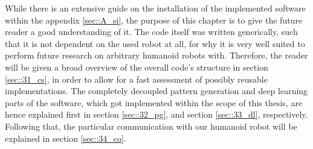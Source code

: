 While there is an extensive guide on the installation of the implemented software within the appendix \ref{sec::A_si}, the purpose of this chapter is to give the future reader a good understanding of it. The code itself was written generically, such that it is not dependent on the used robot at all, for why it is very well suited to perform future research on arbitrary humanoid robots with. Therefore, the reader will be given a broad overview of the overall code's structure in section \ref{sec::31_cs}, in order to allow for a fast assessment of possibly reusable implementations. The completely decoupled pattern generation and deep learning parts of the software, which got implemented within the scope of this thesis, are hence explained first in section \ref{sec::32_pg}, and section \ref{sec::33_dl}, respectively. Following that, the particular communication with our humanoid robot will be explained in section \ref{sec::34_co}.















